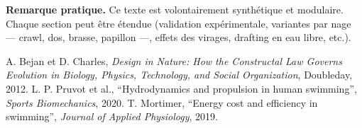 \documentclass[11pt,a4paper]{article}
\begin{document}
\bigskip
\noindent\textbf{Remarque pratique.} Ce texte est volontairement synthétique et modulaire. Chaque section peut être étendue (validation expérimentale, variantes par nage — crawl, dos, brasse, papillon —, effets des virages, drafting en eau libre, etc.).

\begin{thebibliography}{9}
 A. Bejan et D. Charles, \emph{Design in Nature: How the Constructal Law Governs Evolution in Biology, Physics, Technology, and Social Organization}, Doubleday, 2012.
 L. P. Pruvot et al., ``Hydrodynamics and propulsion in human swimming'', \emph{Sports Biomechanics}, 2020.
 T. Mortimer, ``Energy cost and efficiency in swimming'', \emph{Journal of Applied Physiology}, 2019.
\end{thebibliography}
\end{document}
